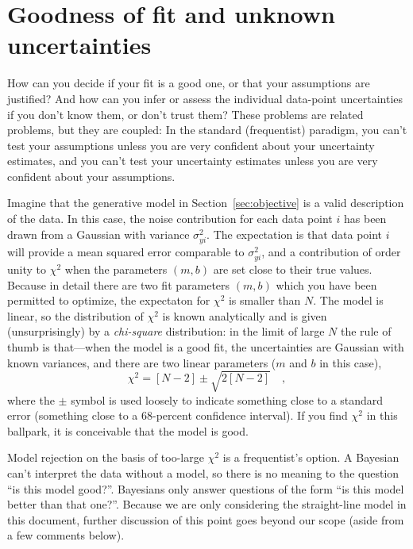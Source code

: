 \documentclass[12pt,twoside]{article}
\newcommand{\documentname}{document}
\newcommand{\sectionname}{Section}
\newcounter{problem}
\begin{document}
\section{Goodness of fit and unknown uncertainties}\label{sec:goodness}

How can you decide if your fit is a good one, or that your assumptions
are justified?  And how can you infer or assess the individual
data-point uncertainties if you don't know them, or don't trust them?
These problems are related problems, but they are coupled: In the
standard (frequentist) paradigm, you can't test your assumptions
unless you are very confident about your uncertainty estimates, and
you can't test your uncertainty estimates unless you are very
confident about your assumptions.

Imagine that the generative model in \sectionname~\ref{sec:objective}
is a valid description of the data.  In this case, the noise
contribution for each data point $i$ has been drawn from a Gaussian
with variance $\sigma_{yi}^2$.  The expectation is that data point $i$
will provide a mean squared error comparable to $\sigma_{yi}^2$, and a
contribution of order unity to $\chi^2$ when the parameters $(m,b)$
are set close to their true values.  Because in detail there are two
fit parameters $(m,b)$ which you have been permitted to optimize, the
expectaton for $\chi^2$ is smaller than $N$. The model is linear, so
the distribution of $\chi^2$ is known analytically and is given
(unsurprisingly) by a \emph{chi-square} distribution: in the limit of
large $N$ the rule of thumb is that---when the model is a good fit,
the uncertainties are Gaussian with known variances, and there are two
linear parameters ($m$ and $b$ in this case),
\begin{equation}
\chi^2 = [N-2] \pm \sqrt{2[N-2]} \quad ,
\end{equation}
where the $\pm$ symbol is used loosely to indicate something close to
a standard error (something close to a 68-percent confidence
interval).  If you find $\chi^2$ in this ballpark, it is conceivable
that the model is good.

Model rejection on the basis of too-large $\chi^2$ is a frequentist's
option.  A Bayesian can't interpret the data without a model, so there
is no meaning to the question ``is this model good?''.  Bayesians only
answer questions of the form ``is this model better than that one?''.
Because we are only considering the straight-line model in this
\documentname, further discussion of this point goes beyond our scope
(aside from a few comments below).
\end{document}
